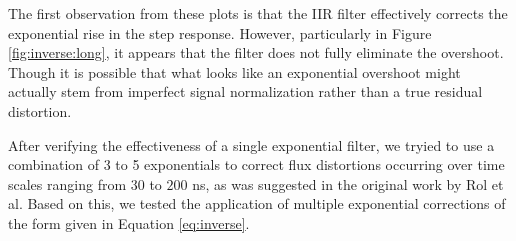The first observation from these plots is that the IIR filter effectively corrects the exponential rise in the step response. %
However, particularly in Figure \ref{fig:inverse:long}, it appears that the filter does not fully eliminate the overshoot. 
Though it is possible that what looks like an exponential overshoot might actually stem from imperfect signal normalization rather than a true residual distortion.

After verifying the effectiveness of a single exponential filter, we tryied to use a combination of 3 to 5 exponentials to correct flux distortions occurring over time scales ranging from $30$ to $200$ ns, as was suggested in the original work by Rol et al. 
Based on this, we tested the application of multiple exponential corrections of the form given in Equation \ref{eq:inverse}.

